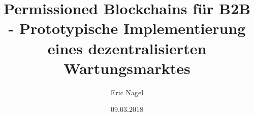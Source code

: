 \documentclass[a4paper,12pt,headsepline]{report}
\title{Permissioned Blockchains für B2B - Prototypische Implementierung eines dezentralisierten Wartungsmarktes}
\author{Eric Nagel}
\date{09.03.2018}
\begin{document}

 

 
 
\tableofcontents %

\listoffigures %

\listoftables %

\renewcommand{\lstlistlistingname}{Listingverzeichnis}
\lstlistoflistings

\pagestyle{plain} %


	










			
\end{document}
